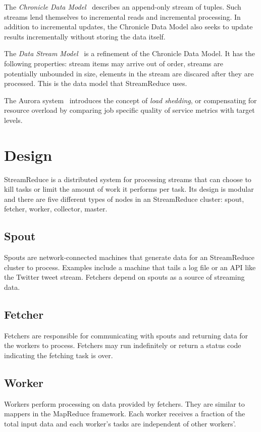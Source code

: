 \documentclass[12pt,twocolumn]{article}
\begin{document}
The \emph{Chronicle Data Model}~\cite{Jagadish:1995:VMI:212433.220201} describes an
append-only stream of tuples. Such
streams lend themselves to incremental reads and incremental processing. In addition to incremental
updates, the Chronicle Data Model also seeks to update results incrementally without storing the
data itself.

The \emph{Data Stream Model}~\cite{Babcock:2002:MID:543613.543615} is a refinement of the Chronicle
Data Model. It has the following properties: stream items may arrive out of order,
streams are potentially unbounded in size, elements in the stream are discared after they are
processed. This is the data model that StreamReduce uses.

The Aurora system~\cite{Carney:2002:MSN:1287369.1287389} introduces the concept of
\emph{load shedding}, or compensating for
resource overload by comparing job specific quality of service metrics with target levels.

\section{Design}
\label{sec:design}
StreamReduce is a distributed system for processing streams that can choose to kill tasks or
limit the amount of work it performs per task. Its design is modular and there are five
different types of nodes in an StreamReduce cluster: spout, fetcher, worker, collector, master.
\subsection{Spout}
Spouts are network-connected machines that generate data for an StreamReduce cluster to process.
Examples include a machine that tails a log file or an API like the Twitter tweet
stream. Fetchers depend on spouts as a source of streaming data.
\subsection{Fetcher}
Fetchers are responsible for communicating with spouts and returning data for the
workers to process. Fetchers may run indefinitely or return a status code indicating
the fetching task is over.
\subsection{Worker}
Workers perform processing on data provided by fetchers. They are similar to mappers
in the MapReduce framework. Each worker receives a fraction of the total input data
and each worker's tasks are independent of other workers'.
\end{document}
